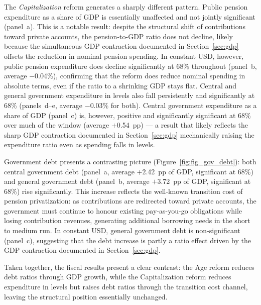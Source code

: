 \documentclass[11pt,english,a4paper, twoside, authoryear]{article}
\begin{document}
The \textit{Capitalization} reform generates a sharply different pattern. Public pension expenditure as a share of GDP is essentially unaffected and not jointly significant (panel~a). This is a notable result: despite the structural shift of contributions toward private accounts, the pension-to-GDP ratio does not decline, likely because the simultaneous GDP contraction documented in Section~\ref{sec:gdp} offsets the reduction in nominal pension spending. In constant USD, however, public pension expenditure does decline significantly at 68\% throughout (panel~b, average $-$0.04\%), confirming that the reform does reduce nominal spending in absolute terms, even if the ratio to a shrinking GDP stays flat. Central and general government expenditure in levels also fall persistently and significantly at 68\% (panels~d--e, average $-$0.03\% for both). Central government expenditure as a share of GDP (panel~c) is, however, positive and significantly significant at 68\% over much of the window (average $+$0.54~pp) --- a result that likely reflects the sharp GDP contraction documented in Section~\ref{sec:gdp} mechanically raising the expenditure ratio even as spending falls in levels.

Government debt presents a contrasting picture (Figure~\ref{fig:fig_gov_debt}): both central government debt (panel~a, average $+$2.42~pp of GDP, significant at 68\%) and general government debt (panel~b, average $+$3.72~pp of GDP, significant at 68\%) rise significantly. This increase reflects the well-known transition cost of pension privatization: as contributions are redirected toward private accounts, the government must continue to honour existing pay-as-you-go obligations while losing contribution revenues, generating additional borrowing needs in the short to medium run. In constant USD, general government debt is non-significant (panel~c), suggesting that the debt increase is partly a ratio effect driven by the GDP contraction documented in Section~\ref{sec:gdp}. %

Taken together, the fiscal results present a clear contrast: the Age reform reduces debt ratios through GDP growth, while the Capitalization reform reduces expenditure in levels but raises debt ratios through the transition cost channel, leaving the structural position essentially unchanged.
\end{document}
